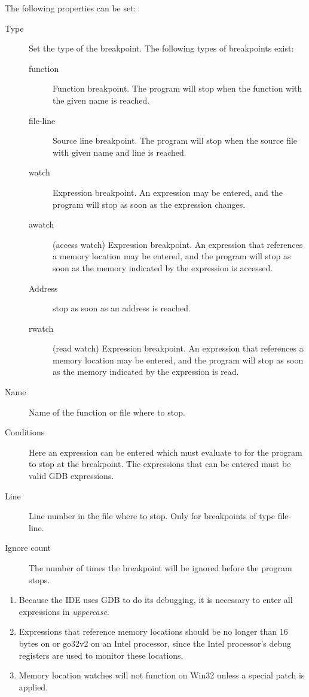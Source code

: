 The following properties can be set:
\begin{description}
\item[Type] Set the type of the breakpoint. The following types of breakpoints
exist:
\begin{description}
\item[function] Function breakpoint. The program will stop when the function
with the given name is reached.
\item[file-line] Source line breakpoint. The program will stop when the
source file with given name and line is reached.
\item[watch] Expression breakpoint. An expression may be entered, and the
program will stop as soon as the expression changes.
\item[awatch] (access watch) Expression breakpoint. An expression that references a
memory location may be entered, and the program will stop as soon as
the memory indicated by the expression is accessed.
\item[Address] stop as soon as an address is reached.
\item[rwatch] (read watch) Expression breakpoint. An expression that references a
memory location may be entered, and the program will stop as soon as
the memory indicated by the expression is read.
\end{description}
\item[Name] Name of the function or file where to stop.
\item[Conditions] Here an expression can be entered which must evaluate to
 for the program to stop at the breakpoint. The expressions that
can be entered must be valid GDB expressions.
\item[Line] Line number in the file where to stop. Only for breakpoints of
type file-line.
\item[Ignore count] The number of times the breakpoint will be ignored
before the program stops.
\end{description}
\begin{remark}
\begin{enumerate}
\item Because the IDE uses GDB to do its debugging, it is necessary to enter all
expressions in {\em uppercase}.
\item Expressions that reference memory locations should be no longer than 16
bytes on \linux or go32v2 on an Intel processor, since the Intel processor's
debug registers are used to monitor these locations.
\item Memory location watches will not function on Win32 unless a special
patch is applied.
\end{enumerate}
\end{remark}

